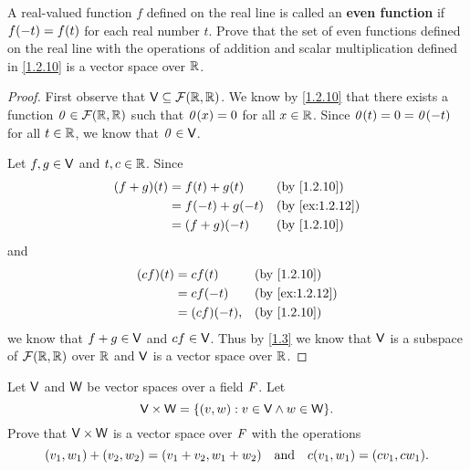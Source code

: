 \begin{ex}\label{ex:1.2.12}
	A real-valued function \(f\) defined on the real line is called an \textbf{even function} if \(f\p{-t} = f\p{t}\) for each real number \(t\).
	Prove that the set of even functions defined on the real line with the operations of addition and scalar multiplication defined in \cref{1.2.10} is a vector space over \(\mathbb{R}\).
\end{ex}

\begin{proof}
	First observe that \(\V \subseteq \fs{\R}{\R}\).
	We know by \cref{1.2.10} that there exists a function \(\zv \in \fs{\R}{\R}\) such that \(\mathit{0}(x) = 0\) for all \(x \in \mathbb{R}\).
	Since \(\mathit{0}(t) = 0 = \mathit{0}(-t)\) for all \(t \in \mathbb{R}\), we know that \(\mathit{0} \in \mathsf{V}\).

	Let \(f, g \in \mathsf{V}\) and \(t, c \in \mathbb{R}\).
	Since
	\begin{align*}
		\p{f + g}\p{t} & = f\p{t} + g\p{t}   &  & \text{(by \cref{1.2.10})}    \\
		               & = f\p{-t} + g\p{-t} &  & \text{(by \cref{ex:1.2.12})} \\
		               & = \p{f + g}\p{-t}   &  & \text{(by \cref{1.2.10})}
	\end{align*}
	and
	\begin{align*}
		\p{cf}\p{t} & = cf\p{t}       &  & \text{(by \cref{1.2.10})}    \\
		            & = cf\p{-t}      &  & \text{(by \cref{ex:1.2.12})} \\
		            & = \p{cf}\p{-t}, &  & \text{(by \cref{1.2.10})}
	\end{align*}
	we know that \(f + g \in \mathsf{V}\) and \(cf \in \mathsf{V}\).
	Thus by \cref{1.3} we know that \(\mathsf{V}\) is a subspace of \(\fs{\R}{\R}\) over \(\mathbb{R}\) and \(\mathsf{V}\) is a vector space over \(\mathbb{R}\).
\end{proof}

\setcounter{ex}{20}
\begin{ex}\label{ex:1.2.21}
	Let \(\mathsf{V}\) and \(\mathsf{W}\) be vector spaces over a field \(\mathit{F}\).
	Let
	\[
		\V \times \W = \set{\p{v, w} : v \in \V \land w \in \W}.
	\]
	Prove that \(\mathsf{V} \times \mathsf{W}\) is a vector space over \(\mathit{F}\) with the operations
	\[
		\p{v_1, w_1} + \p{v_2, w_2} = \p{v_1 + v_2, w_1 + w_2} \quad \text{and} \quad c\p{v_1, w_1} = \p{cv_1, cw_1}.
	\]
\end{ex}

